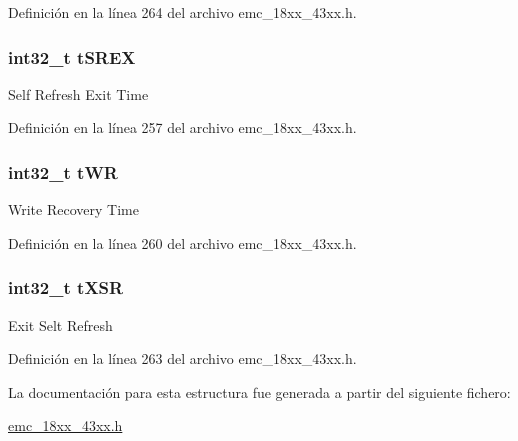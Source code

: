 Definición en la línea 264 del archivo emc\+\_\+18xx\+\_\+43xx.\+h.

\subsubsection[{\texorpdfstring{t\+S\+R\+EX}{tSREX}}]{\setlength{\rightskip}{0pt plus 5cm}int32\+\_\+t t\+S\+R\+EX}\hypertarget{struct_i_p___e_m_c___d_y_n___c_o_n_f_i_g___t_a142118a0bc5af59b2f620cf91d25d33e}{}\label{struct_i_p___e_m_c___d_y_n___c_o_n_f_i_g___t_a142118a0bc5af59b2f620cf91d25d33e}
Self Refresh Exit Time 

Definición en la línea 257 del archivo emc\+\_\+18xx\+\_\+43xx.\+h.

\subsubsection[{\texorpdfstring{t\+WR}{tWR}}]{\setlength{\rightskip}{0pt plus 5cm}int32\+\_\+t t\+WR}\hypertarget{struct_i_p___e_m_c___d_y_n___c_o_n_f_i_g___t_a6e616990a47db6cc19ed8069336a9a06}{}\label{struct_i_p___e_m_c___d_y_n___c_o_n_f_i_g___t_a6e616990a47db6cc19ed8069336a9a06}
Write Recovery Time 

Definición en la línea 260 del archivo emc\+\_\+18xx\+\_\+43xx.\+h.

\subsubsection[{\texorpdfstring{t\+X\+SR}{tXSR}}]{\setlength{\rightskip}{0pt plus 5cm}int32\+\_\+t t\+X\+SR}\hypertarget{struct_i_p___e_m_c___d_y_n___c_o_n_f_i_g___t_ae0ecf804a46e12e638905cd3bef2de71}{}\label{struct_i_p___e_m_c___d_y_n___c_o_n_f_i_g___t_ae0ecf804a46e12e638905cd3bef2de71}
Exit Selt Refresh 

Definición en la línea 263 del archivo emc\+\_\+18xx\+\_\+43xx.\+h.



La documentación para esta estructura fue generada a partir del siguiente fichero\+:\begin{DoxyCompactItemize}
\item 
\hyperlink{emc__18xx__43xx_8h}{emc\+\_\+18xx\+\_\+43xx.\+h}\end{DoxyCompactItemize}
